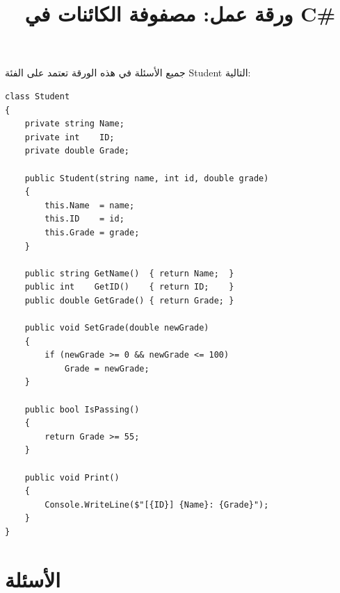 \documentclass[14pt]{extarticle}
\title{ورقة عمل: مصفوفة الكائنات في \textenglish{C\#}}
\begin{document}
\maketitle
\thispagestyle{fancy}

جميع الأسئلة في هذه الورقة تعتمد على الفئة \textenglish{Student} التالية:

{\small
\begin{boxExample}
\begin{english}
\begin{verbatim}
class Student
{
    private string Name;
    private int    ID;
    private double Grade;

    public Student(string name, int id, double grade)
    {
        this.Name  = name;
        this.ID    = id;
        this.Grade = grade;
    }

    public string GetName()  { return Name;  }
    public int    GetID()    { return ID;    }
    public double GetGrade() { return Grade; }

    public void SetGrade(double newGrade)
    {
        if (newGrade >= 0 && newGrade <= 100)
            Grade = newGrade;
    }

    public bool IsPassing()
    {
        return Grade >= 55;
    }

    public void Print()
    {
        Console.WriteLine($"[{ID}] {Name}: {Grade}");
    }
}
\end{verbatim}
\end{english}
\end{boxExample}
}
\clearpage

\section*{الأسئلة}
\end{document}
